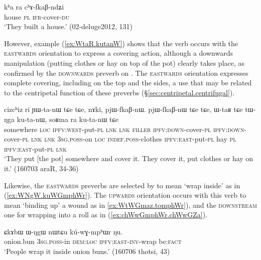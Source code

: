 \begin{exe}
\ex \label{ex:kha.chAfkaBndZi}
\gll kʰa ra cʰɤ-fkaβ-ndʑi  \\
house \textsc{pl} \textsc{ifr}-cover-\textsc{du}   \\
\glt `They built a house.' (02-deluge2012, 131)
\end{exe}

However, example (\ref{ex:WtaR.kutanW}) shows that the verb  occurs with the \textsc{eastwards} orientation to express a covering action, although a downwards manipulation (putting clothes or hay on top of the pot) clearly takes place, as confirmed by the \textsc{downwards} preverb on . The \textsc{eastwards} orientation expresses complete covering, including on the top and the sides, a use that may be related to the centripetal function of these preverbs (§\ref{sec:centripetal.centrifugal}). 

\begin{exe}
\ex \label{ex:WtaR.kutanW}
\gll  cizcʰiz ri ɲɯ-ta-nɯ tɕe tɕe, nɤki, pjɯ-fkaβ-nɯ. pjɯ-fkaβ-nɯ tɕe tɕe, ɯ-taʁ tɕe tɯ-ŋga ku-ta-nɯ, soʁma ra ku-ta-nɯ tɕe \\
somewhere \textsc{loc} \textsc{ipfv}:\textsc{west}-put-\textsc{pl} \textsc{lnk} \textsc{lnk} \textsc{filler} \textsc{ipfv}:\textsc{down}-cover-\textsc{pl} \textsc{ipfv}:\textsc{down}-cover-\textsc{pl} \textsc{lnk} \textsc{lnk} \textsc{3sg}.\textsc{poss}-on \textsc{loc} \textsc{indef}.\textsc{poss}-clothes \textsc{ipfv}:\textsc{east}-put-\textsc{pl} hay \textsc{pl} \textsc{ipfv}:\textsc{east}-put-\textsc{pl} \textsc{lnk} \\
\glt `They put [the pot] somewhere and cover it. They cover it, put clothes or hay on it.' (160703 araR, 34-36)
\end{exe}

Likewise, the \textsc{eastwards} preverbs are selected by  to mean `wrap inside' as in (\ref{ex:WNgW.kuWGmphWr}). The  \textsc{upwards} orientation occurs with this verb to mean `binding up' a wound as in \ref{ex:WtWGmaz.tomphWr}), and the \textsc{downstream} one for wrapping into a roll as in (\ref{ex:chWwGmphWr.chWwGZa}).
 
\begin{exe}
\ex \label{ex:WNgW.kuWGmphWr}
\gll  ɕkɤbɯ ɯ-ŋgɯ nɯtɕu kú-wɣ-mpʰɯr ŋu. \\
onion.bun \textsc{3sg}.\textsc{poss}-in \textsc{dem}:\textsc{loc} \textsc{ipfv}:\textsc{east}-\textsc{inv}-wrap be:\textsc{fact} \\
\glt `People wrap it inside onion buns.' (160706 thotsi, 43)
 \end{exe}

